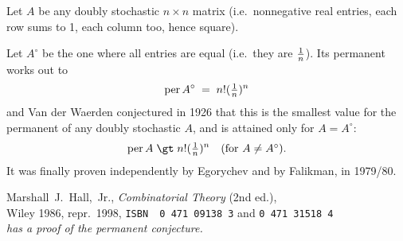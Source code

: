 \documentclass[12pt]{article}
\let\T\textstyle
\let\S\scriptstyle
\let\SS\scriptscriptstyle
\def\frac#1#2{\mathord{\mathchoice%
{\T{#1\over#2}}
{\T{#1\over#2}}
{\S{#1\over#2}}
{\SS{#1\over#2}}}}
\def\bitem#1{\bibitem[#1]{#1}}
\def\name#1{{\sc #1}}
\def\book#1{{\sl #1\/}}
\def\isbn#1{{\small\tt ISBN\,\,#1}}
\def\seq#1{{\small\tt #1}}
\begin{document}
\def\per{\mathop{\rm per}\nolimits}

Let $A$ be any doubly stochastic $n\times n$ matrix (i.e.\ nonnegative real entries, each row sums to 1, each column too, hence square).

Let $A^\circ$ be the one where all entries are equal (i.e.\ they are $\frac1n$). Its permanent works out to
$$
  \per A^\circ \;=\; n!(\frac1n)^n
$$
and Van der Waerden conjecture{}d in 1926 that this is the smallest value for the permanent of any doubly stochastic $A$, and is attained only for $A=A^\circ$:
$$
  \per A \;\gt\; n!(\frac1n)^n \quad\hbox{(for $A \ne A^\circ$).}
$$
It was finally proven independently by Egorychev and by Falikman, in 1979/80.

\raggedright
\begin{thebibliography}{Hal86}

\bitem{Hal86} \name{Marshall~J.~Hall,~Jr.},
              \book{Combinatorial Theory} (2nd ed.),\\
              Wiley 1986, repr.~1998,
              \isbn{0\,471\,09138\,3} and \seq{0\,471\,31518\,4}\\
              {\em has a proof of the permanent conjecture.}

\end{thebibliography}
\end{document}
